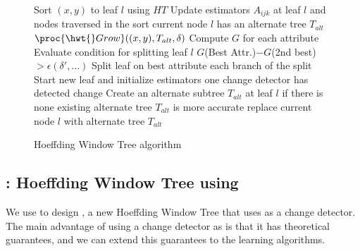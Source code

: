 \begin{figure}
\begin{codebox}
\li  Sort $(x,y)$ to leaf $l$ using $HT$ 
\li  Update estimators $A_{ijk}$ %
\li  \hspace{.3cm} at leaf $l$ and nodes traversed in the sort
\li \If current node $l$ has an alternate tree $T_{alt}$
\li \hspace{.3cm} $\proc{\hwt{}Grow} ((x,y),T_{alt}, \delta)$ \End
\li  Compute $G$ for each attribute
\zi \Comment Evaluate condition for splitting leaf $l$
\li \If $G$(Best Attr.)$ - G$(2nd best) $> \epsilon(\delta', \dots)$ 
\li \Then Split leaf on best attribute
\li \For each branch of the split
\li    \Do   Start new leaf 
\li  \hspace{.3cm} and initialize estimators %
\End  
\End %
\li \If one change detector has detected change
\li \Then Create an alternate subtree $T_{alt}$ at leaf $l$ if there is none
\End
\li \If existing alternate tree $T_{alt}$ is more accurate
\li \Then replace current node $l$ with alternate tree $T_{alt}$ 
\End
\end{codebox}
\caption{Hoeffding Window Tree algorithm}
\label{AVFDT2}
\end{figure}

\subsection{\HWTAdwin: Hoeffding Window Tree using \adwin}

We use \adwin to design \HWTAdwinb, a new Hoeffding Window Tree 
that uses \adwin as a change detector.
The main advantage of using a change detector as \adwin is that it has theoretical guarantees, and
we can extend this guarantees to the learning algorithms.
\BEGINOMIT

